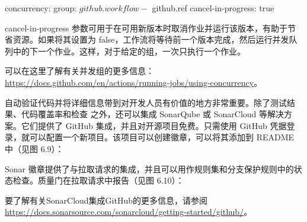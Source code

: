 \begin{shell}
concurrency:
  group: ${{ github.workflow }}-${{ github.ref }}
  cancel-in-progress: true
\end{shell}

cancel-in-progress 参数可用于在可用新版本时取消作业并运行该版本，有助于节省资源。如果将其设置为 false，工作流将等待前一个版本完成，然后运行并发队列中的下一个作业。这样，对于给定的组，一次只执行一个作业。

可以在这里了解有关并发组的更多信息：\url{https://docs.github.com/en/actions/running-jobs/using-concurrency}。


自动验证代码并将详细信息带到对开发人员有价值的地方非常重要。除了测试结果、代码覆盖率和检查 之外，还可以集成 SonarQube 或 SonarCloud 等解决方案。它们提供了 GitHub 集成，并且对开源项目免费。只需使用 GitHub 凭据登录，就可以配置一个新项目。该项目可以创建徽章，可以将其添加到 README 中（见图 6.9）：


Sonar 徽章提供了与拉取请求的集成，并且可以用作规则集和分支保护规则中的状态检查。质量门在拉取请求中报告（见图 6.10）：


要了解有关SonarCloud集成GitHub的更多信息，请参阅\url{https://docs.sonarsource.com/sonarcloud/getting-started/github/}。














